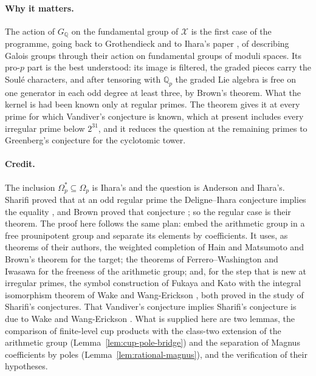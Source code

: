 \documentclass[11pt]{article}
\theoremstyle{definition}
\numberwithin{equation}{section}
\begin{document}
\paragraph{Why it matters.}
The action of $G_{\mathbb Q}$ on the fundamental group of $\mathcal X$ is the first case of the programme, going
back to Grothendieck and to Ihara's paper \cite{Ihara1986}, of describing Galois groups through their action on
fundamental groups of moduli spaces. Its pro-$p$ part is the best understood: its image is filtered, the graded
pieces carry the Soul\'e characters, and after tensoring with $\mathbb Q_p$ the graded Lie algebra is free on one
generator in each odd degree at least three, by Brown's theorem. What the kernel is had been known only at regular
primes. The theorem gives it at every prime for which Vandiver's conjecture is known, which at present includes
every irregular prime below $2^{31}$, and it reduces the question at the remaining primes to Greenberg's
conjecture for the cyclotomic tower.

\paragraph{Credit.}
The inclusion $\Omega_p^*\subseteq\Omega_p$ is Ihara's and the question is Anderson and Ihara's. Sharifi proved
that at an odd regular prime the Deligne--Ihara conjecture implies the equality \cite[Theorem~1, p.~2]{Sharifi2002},
and Brown proved that conjecture \cite[Theorem 1.1]{Brown2012}; so the regular case is their theorem. The proof
here follows the same plan: embed the arithmetic group in a free prounipotent group and separate its elements by
coefficients. It uses, as theorems of their authors, the weighted completion of Hain and Matsumoto
\cite{HainMatsumoto2001} and Brown's theorem for the target; the theorems of Ferrero--Washington
\cite{FerreroWashington1979} and Iwasawa \cite{Iwasawa1981} for the freeness of the arithmetic group; and, for the
step that is new at irregular primes, the symbol construction of Fukaya and Kato \cite{FukayaKato2012} with the
integral isomorphism theorem of Wake and Wang-Erickson \cite{WakeWangEricksonPseudo2018}, both proved in the
study of Sharifi's conjectures. That Vandiver's conjecture implies Sharifi's conjecture is due to Wake and
Wang-Erickson \cite[abstract and Corollary~5.1.2]{WakeWangErickson2017}. What is supplied here are two lemmas, the comparison of finite-level cup products
with the class-two extension of the arithmetic group (Lemma~\ref{lem:cup-pole-bridge}) and the separation of
Magnus coefficients by poles (Lemma~\ref{lem:rational-magnus}), and the verification of their hypotheses.
\end{document}

